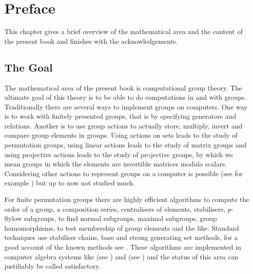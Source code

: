 
\chapter*{Preface}

\renewcommand{\thechapter}{0}

This chapter gives a brief overview of the mathematical area and the 
content of the present book and finishes with the acknowledgements.

\section{The Goal}

The mathematical area of the present book is computational group
theory. The ultimate goal of this theory is to be able to do
computations in and with groups. Traditionally there are several ways
to implement groups on computers. One way is to work with finitely
presented groups, that is by specifying generators and relations.
Another is to use group actions to actually store,
multiply, invert and compare group elements in groups. Using 
actions on sets leads to the study of permutation groups, using linear
actions leads to the study of matrix groups and using projective
actions leads to the study of projective groups, by which we mean
groups in which the elements are invertible matrices modulo scalars.
Considering other actions to represent groups on a computer is
possible (see for example \cite{Kohl}) but up to now not studied much.

For finite permutation groups there are highly efficient
algorithms to compute the order of a group, a composition series,
centralisers of elements, stabilisers, $p$-Sylow subgroups, to find
normal subgroups, maximal subgroups, group homomorphisms, to test
membership of group elements and the like.
Standard techniques use stabiliser chains, base and strong generating
set methods, for a good account of the known methods see \cite{Ser}. 
These algorithms are implemented in computer algebra
systems like {\GAP} (see \cite{GAP4}) and {\MAGMA} (see \cite{Magma})
and the status of this area can justifiably be called satisfactory.

